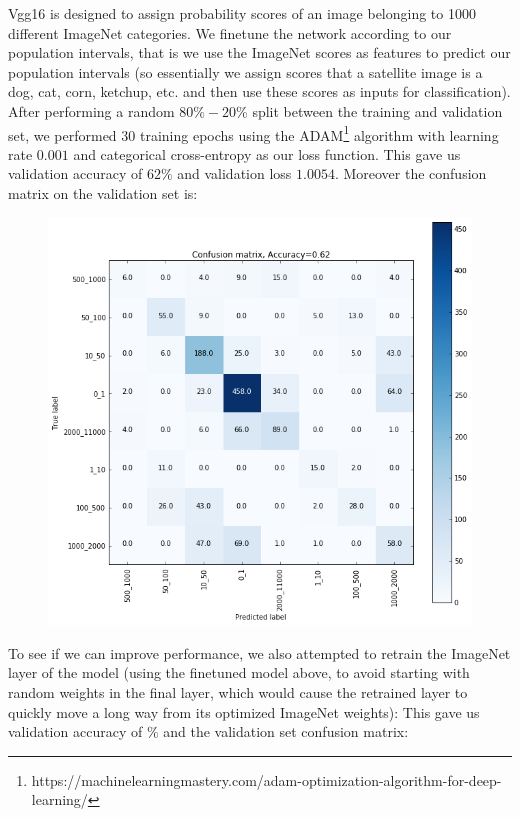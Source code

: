 \documentclass{article}
\begin{document}
Vgg16 is designed to assign probability scores of an image belonging to 1000 different ImageNet categories. We finetune the network according to our population intervals, that is we use the ImageNet scores as features to predict our population intervals (so essentially we assign scores that a satellite image is a dog, cat, corn, ketchup, etc. and then use these scores as inputs for classification). After performing a random $80\%-20\%$ split between the training and validation set, we performed 30 training epochs using the ADAM\footnote{https://machinelearningmastery.com/adam-optimization-algorithm-for-deep-learning/} algorithm with learning rate $0.001$ and categorical cross-entropy as our loss function. This gave us validation accuracy of $62\%$ and validation loss $1.0054$. Moreover the confusion matrix on the validation set is:
\begin{figure}[ht]
\centering
\includegraphics[scale=0.45]{conf_mx_Zsolt1.png}
\end{figure}

To see if we can improve performance, we also attempted to retrain the ImageNet layer of the model (using the finetuned model above, to avoid starting with random weights in the final layer, which would cause the retrained layer to quickly move a long way from its optimized ImageNet weights): This gave us  validation accuracy of $\%$ and the validation set confusion matrix:
\end{document}

